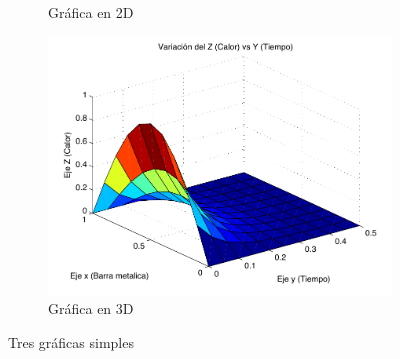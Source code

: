 \documentclass[a4paper, 11pt]{article}
\begin{document}
\begin{figure}[ht]
\begin{subfigure}[b]{0.3\textwidth}
                \caption{Gráfica en 2D}
                \label{fig: Gráfica en 2D}
            \end{subfigure}
            \hfill
            \begin{subfigure}[b]{0.3\textwidth}
                \centering
                \includegraphics[width=\textwidth]{04_ENTORNOS_FLOTANTES/images/Grafica3D.pdf}
                \caption{Gráfica en 3D}
                \label{fig: Gráfica en 3D}
            \end{subfigure}
            \caption{Tres gráficas simples}
            \label{fig: tres gráficas simples}
        \end{figure}
        
        
        

        


        

    
\end{document}

